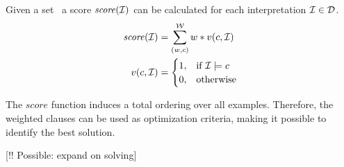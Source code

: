 Given a set~ a score $\mathit{score}(\mathcal{I})$ can be calculated for each interpretation $\mathcal{I} \in \mathcal{D}$.
\begin{align*}
	\mathit{score}(\mathcal{I}) &= \sum\limits_{(w, c)}^{\mathcal{W}} w * v(c, \mathcal{I}) \\
	v(c, \mathcal{I}) &=
	\begin{cases}
		1,& \text{if } \mathcal{I} \models c\\
		0,& \text{otherwise}
	\end{cases}
\end{align*}

The $\mathit{score}$ function induces a total ordering over all examples.
Therefore, the weighted clauses  can be used as optimization criteria, making it possible to identify the best solution.

[!! Possible: expand on solving]
